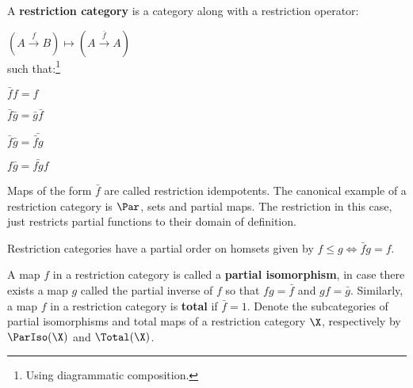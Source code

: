 \begin{definition}\cite[\S 2.1.1]{cockett}
A {\bf restriction category} is a category along with a restriction operator:

\hfil
$
(A \xrightarrow{f} B )\mapsto (A \xrightarrow{\bar f} A)
$\\
such that:\footnote{Using diagrammatic composition.}


\begin{center}
\begin{multicols}{4}
\begin{enumerate}[label={\bf [R.\arabic*]}, ref={\bf [R.\arabic*]}]
\item $\bar f f  = f$
\label{R.1}
\item $\bar f \bar g = \bar g \bar f$
\label{R.2}
\item $\bar f \bar g = \bar{\bar f g}$
\label{R.3}
\item $f \bar g = \bar{fg} f$
\label{R.4}
\end{enumerate}
\end{multicols}
\end{center}


Maps of the form $\bar f$ are called restriction idempotents.
The canonical example of a restriction category is $\Par$, sets and partial maps.  The restriction in this case, just restricts partial functions to their domain of definition.


Restriction categories have a partial order on homsets given by $f \leq g \iff \bar f g = f$.


A map $f$ in a restriction category is called a {\bf partial isomorphism}, in case there exists a map $g$ called the partial inverse of $f$ so that $fg=\bar f$ and $gf = \bar g$.  Similarly, a map $f$ in a restriction category is {\bf total} if $\bar f =1$.  Denote the subcategories of partial isomorphisms and total maps of a restriction category $\X$, respectively by $\ParIso(\X)$ and $\Total(\X)$.



\end{definition}




